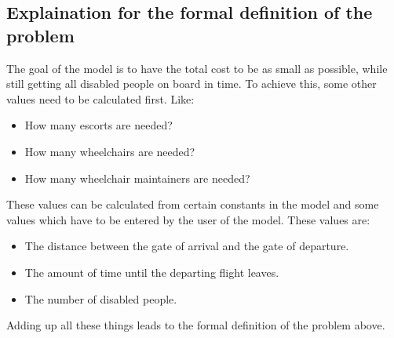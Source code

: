 \documentclass[a4paper, 11pt, notitlepage]{report}
\begin{document}
	\subsection{Explaination for the formal definition of the problem}
	The goal of the model is to have the total cost to be as small as possible, while still getting all disabled people on board in time. To achieve this, some other values need to be calculated first. Like:
\begin{itemize}
  \item How many escorts are needed?
  \item How many wheelchairs are needed?
  \item How many wheelchair maintainers are needed?
\end{itemize}
These values can be calculated from certain constants in the model and some values which have to be entered by the user of the model. These values are:
\begin{itemize}
  \item The distance between the gate of arrival and the gate of departure.
  \item The amount of time until the departing flight leaves.
  \item The number of disabled people.
\end{itemize}
Adding up all these things leads to the formal definition of the problem above.


\end{document}

